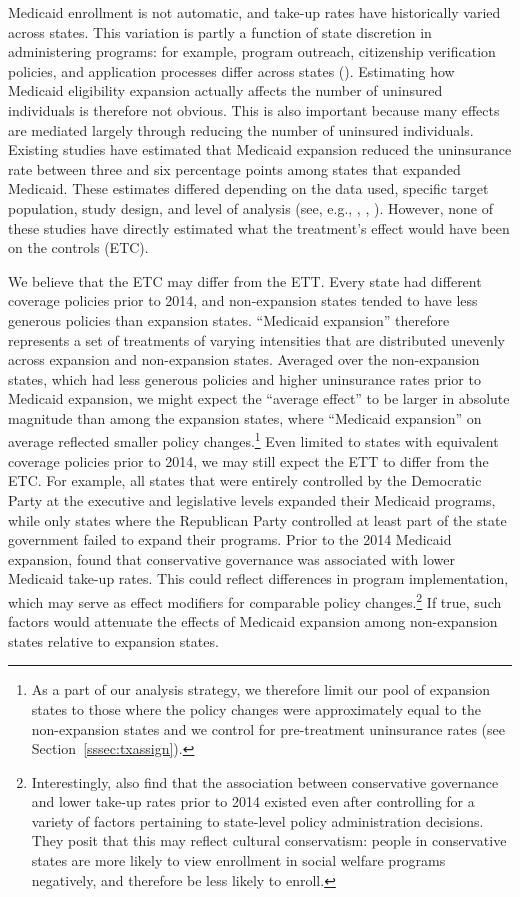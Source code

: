 \documentclass[aoas]{imsart}
\theoremstyle{plain}
\theoremstyle{remark}
\begin{document}
Medicaid enrollment is not automatic, and take-up rates have historically varied across states. This variation is partly a function of state discretion in administering programs: for example, program outreach, citizenship verification policies, and application processes differ across states (\cite{courtemanche2017early}). Estimating how Medicaid eligibility expansion actually affects the number of uninsured individuals is therefore not obvious. This is also important because many effects are mediated largely through reducing the number of uninsured individuals. Existing studies have estimated that Medicaid expansion reduced the uninsurance rate between three and six percentage points among states that expanded Medicaid. These estimates differed depending on the data used, specific target population, study design, and level of analysis (see, e.g., \cite{kaestner2017effects}, \cite{courtemanche2017early}, \cite{frean2017premium}). However, none of these studies have directly estimated what the treatment's effect would have been on the controls (ETC). 

We believe that the ETC may differ from the ETT. Every state had different coverage policies prior to 2014, and non-expansion states tended to have less generous policies than expansion states. ``Medicaid expansion'' therefore represents a set of treatments of varying intensities that are distributed unevenly across expansion and non-expansion states. Averaged over the non-expansion states, which had less generous policies and higher uninsurance rates prior to Medicaid expansion, we might expect the ``average effect'' to be larger in absolute magnitude than among the expansion states, where ``Medicaid expansion'' on average reflected smaller policy changes.\footnote{As a part of our analysis strategy, we therefore limit our pool of expansion states to those where the policy changes were approximately equal to the non-expansion states and we control for pre-treatment uninsurance rates (see Section~\ref{sssec:txassign}).} Even limited to states with equivalent coverage policies prior to 2014, we may still expect the ETT to differ from the ETC. For example, all states that were entirely controlled by the Democratic Party at the executive and legislative levels expanded their Medicaid programs, while only states where the Republican Party controlled at least part of the state government failed to expand their programs. Prior to the 2014 Medicaid expansion, \cite{sommers2012understanding} found that conservative governance was associated with lower Medicaid take-up rates. This could reflect differences in program implementation, which may serve as effect modifiers for comparable policy changes.\footnote{Interestingly, \cite{sommers2012understanding} also find that the association between conservative governance and lower take-up rates prior to 2014 existed even after controlling for a variety of factors pertaining to state-level policy administration decisions. They posit that this may reflect cultural conservatism: people in conservative states are more likely to view enrollment in social welfare programs negatively, and therefore be less likely to enroll.} If true, such factors would attenuate the effects of Medicaid expansion among non-expansion states relative to expansion states.
\end{document}
